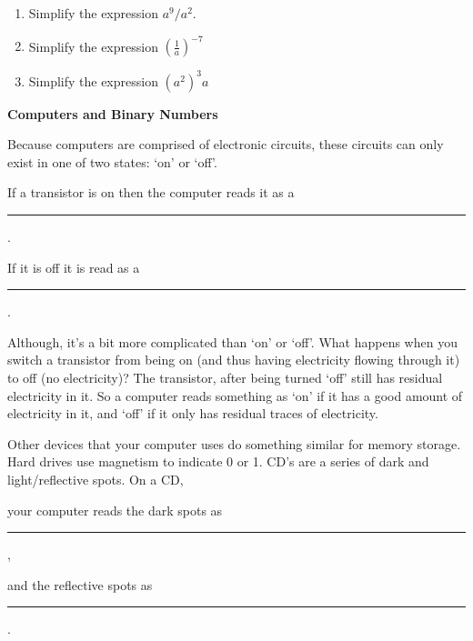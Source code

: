 \documentclass{article}
\begin{document}
\begin{enumerate}

\item Simplify the expression $a^9/a^2$.

\item Simplify the expression $\left(\frac{1}{a}\right)^{-7}$

\item Simplify the expression $\left(a^2\right)^3a$

\end{enumerate}


\newpage

\noindent\textbf{Computers and Binary Numbers}

\vspace{0.3in}

Because computers are comprised of electronic circuits, these circuits can only exist in one of two states: `on' or `off'. 

\vspace{0.2in}

If a transistor is on then the computer reads it as a \rule{1in}{.01in}.

\vspace{0.2in}

If it is off it is read as a \rule{1in}{.01in}.

\vspace{0.2in}
 
 Although, it's a bit more complicated than `on' or `off'. What happens when you switch a transistor from being on (and thus having electricity flowing through it) to off (no electricity)? The transistor, after being turned `off' still has residual electricity in it. So a computer reads something as `on' if it has a good amount of electricity in it, and `off' if it only has residual traces of electricity.
 
 \vspace{0.2in}

Other devices that your computer uses do something similar for memory storage. Hard drives use magnetism to indicate 0 or 1. CD's are a series of dark and light/reflective spots. On a CD,

\vspace{0.2in}

your computer reads the dark spots as \rule{1in}{.01in}, 

\vspace{0.2in}

and the reflective spots as \rule{1in}{.01in}.
\end{document}
